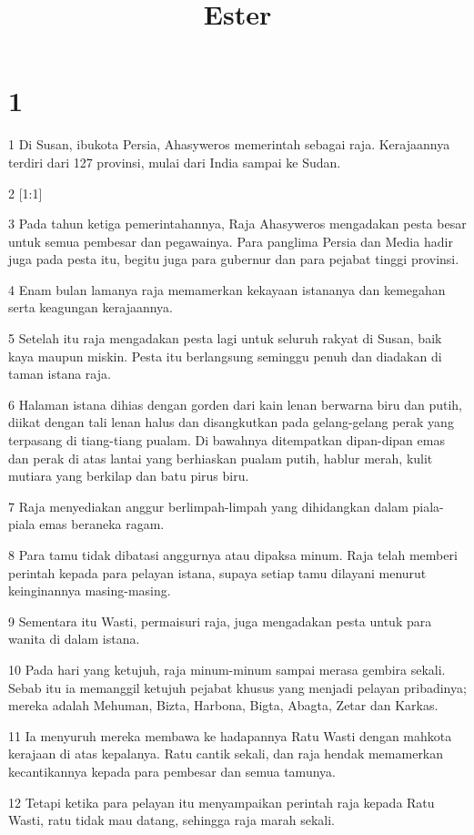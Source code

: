 

\title{Ester}


\chapter{1}

\par 1 Di Susan, ibukota Persia, Ahasyweros memerintah sebagai raja. Kerajaannya terdiri dari 127 provinsi, mulai dari India sampai ke Sudan.
\par 2 [1:1]
\par 3 Pada tahun ketiga pemerintahannya, Raja Ahasyweros mengadakan pesta besar untuk semua pembesar dan pegawainya. Para panglima Persia dan Media hadir juga pada pesta itu, begitu juga para gubernur dan para pejabat tinggi provinsi.
\par 4 Enam bulan lamanya raja memamerkan kekayaan istananya dan kemegahan serta keagungan kerajaannya.
\par 5 Setelah itu raja mengadakan pesta lagi untuk seluruh rakyat di Susan, baik kaya maupun miskin. Pesta itu berlangsung seminggu penuh dan diadakan di taman istana raja.
\par 6 Halaman istana dihias dengan gorden dari kain lenan berwarna biru dan putih, diikat dengan tali lenan halus dan disangkutkan pada gelang-gelang perak yang terpasang di tiang-tiang pualam. Di bawahnya ditempatkan dipan-dipan emas dan perak di atas lantai yang berhiaskan pualam putih, hablur merah, kulit mutiara yang berkilap dan batu pirus biru.
\par 7 Raja menyediakan anggur berlimpah-limpah yang dihidangkan dalam piala-piala emas beraneka ragam.
\par 8 Para tamu tidak dibatasi anggurnya atau dipaksa minum. Raja telah memberi perintah kepada para pelayan istana, supaya setiap tamu dilayani menurut keinginannya masing-masing.
\par 9 Sementara itu Wasti, permaisuri raja, juga mengadakan pesta untuk para wanita di dalam istana.
\par 10 Pada hari yang ketujuh, raja minum-minum sampai merasa gembira sekali. Sebab itu ia memanggil ketujuh pejabat khusus yang menjadi pelayan pribadinya; mereka adalah Mehuman, Bizta, Harbona, Bigta, Abagta, Zetar dan Karkas.
\par 11 Ia menyuruh mereka membawa ke hadapannya Ratu Wasti dengan mahkota kerajaan di atas kepalanya. Ratu cantik sekali, dan raja hendak memamerkan kecantikannya kepada para pembesar dan semua tamunya.
\par 12 Tetapi ketika para pelayan itu menyampaikan perintah raja kepada Ratu Wasti, ratu tidak mau datang, sehingga raja marah sekali.
